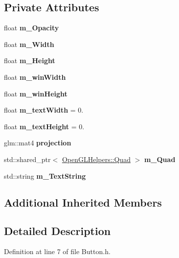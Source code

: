 \subsection*{Private Attributes}
\begin{DoxyCompactItemize}
\item 
float {\bfseries m\+\_\+\+Opacity}\hypertarget{class_button_a65236f721197446602505157028da626}{}\label{class_button_a65236f721197446602505157028da626}

\item 
float {\bfseries m\+\_\+\+Width}\hypertarget{class_button_abb91d7816eb9610ccea86bd7998fa4d2}{}\label{class_button_abb91d7816eb9610ccea86bd7998fa4d2}

\item 
float {\bfseries m\+\_\+\+Height}\hypertarget{class_button_a566dc820d67b7a77441ad07170e1eb75}{}\label{class_button_a566dc820d67b7a77441ad07170e1eb75}

\item 
float {\bfseries m\+\_\+win\+Width}\hypertarget{class_button_a23c34faf74b886dd7ec9c8eca67e466b}{}\label{class_button_a23c34faf74b886dd7ec9c8eca67e466b}

\item 
float {\bfseries m\+\_\+win\+Height}\hypertarget{class_button_a0682411e09402316a1d362d66298f41b}{}\label{class_button_a0682411e09402316a1d362d66298f41b}

\item 
float {\bfseries m\+\_\+text\+Width} = 0.\hypertarget{class_button_ac4d2a5749af6b990e708bd1f062aad3c}{}\label{class_button_ac4d2a5749af6b990e708bd1f062aad3c}

\item 
float {\bfseries m\+\_\+text\+Height} = 0.\hypertarget{class_button_a71a4ddbb20ad2bdea2de33ebac659670}{}\label{class_button_a71a4ddbb20ad2bdea2de33ebac659670}

\item 
glm\+::mat4 {\bfseries projection}\hypertarget{class_button_ab210a540cfa946560ab6e2dd2f5aa9f3}{}\label{class_button_ab210a540cfa946560ab6e2dd2f5aa9f3}

\item 
std\+::shared\+\_\+ptr$<$ \hyperlink{class_open_g_l_helpers_1_1_quad}{Open\+G\+L\+Helpers\+::\+Quad} $>$ {\bfseries m\+\_\+\+Quad}\hypertarget{class_button_a3b1bf861e58dadc97e1554b141b2cb13}{}\label{class_button_a3b1bf861e58dadc97e1554b141b2cb13}

\item 
std\+::string {\bfseries m\+\_\+\+Text\+String}\hypertarget{class_button_af0132736c89e3da304cac4a5ec8d8c02}{}\label{class_button_af0132736c89e3da304cac4a5ec8d8c02}

\end{DoxyCompactItemize}
\subsection*{Additional Inherited Members}


\subsection{Detailed Description}


Definition at line 7 of file Button.\+h.

